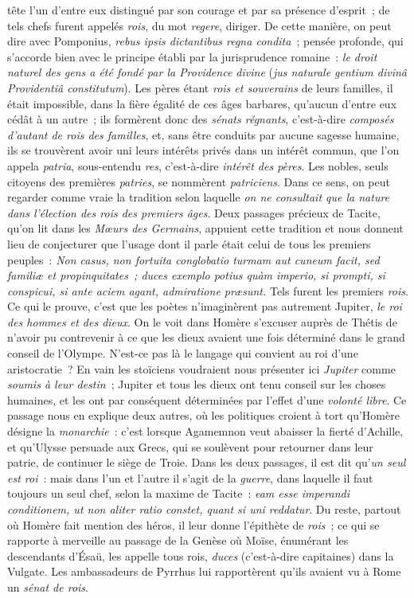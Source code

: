 \documentclass[french,twoside]{book} %
\begin{document}
tête l’un d’entre eux distingué par son courage et par sa présence d’esprit ; de tels chefs furent appelés {\itshape rois}, du mot {\itshape regere}, diriger. De cette manière, on peut dire avec Pomponius, \emph{{\itshape rebus ipsis dictantibus regna condita}} ;  pensée profonde, qui s’accorde bien avec le principe établi par la jurisprudence romaine : {\itshape le droit naturel des gens a été fondé par la Providence divine} (\emph{{\itshape jus naturale gentium divinâ Providentiâ constitutum}}). Les pères étant {\itshape rois et souverains} de leurs familles, il était impossible, dans la fière égalité de ces âges barbares, qu’aucun d’entre eux cédât à un autre ; ils formèrent donc des {\itshape sénats régnants}, c’est-à-dire {\itshape composés d’autant de rois des familles}, et, sans être conduits par aucune sagesse humaine, ils se trouvèrent avoir uni leurs intérêts privés dans un intérêt commun, que l’on appela {\itshape patria}, sous-entendu {\itshape res}, c’est-à-dire {\itshape intérêt des pères}. Les nobles, seuls citoyens des premières {\itshape patries}, se nommèrent {\itshape patriciens}. Dans ce sens, on peut regarder comme vraie la tradition selon laquelle {\itshape on ne consultait que la nature dans l’élection des rois des premiers âges}. Deux passages précieux de Tacite, qu’on lit dans les {\itshape Mœurs des Germains}, appuient cette tradition et nous donnent lieu de conjecturer que l’usage dont il parle était celui de tous les premiers peuples : \emph{{\itshape Non casus, non fortuita conglobatio turmam aut cuneum facit, sed familiæ et propinquitates ; duces exemplo potius quàm imperio, si prompti, si conspicui, si ante aciem agant, admiratione præsunt.}} Tels furent les premiers {\itshape rois}. Ce qui le prouve, c’est que les poètes n’imaginèrent pas autrement Jupiter, {\itshape le roi des hommes et des dieux}. On le voit dans Homère s’excuser auprès de Thétis de n’avoir pu contrevenir à ce que les dieux avaient une fois  déterminé dans le grand conseil de l’Olympe. N’est-ce pas là le langage qui convient au roi d’une aristocratie ? En vain les stoïciens voudraient nous présenter ici {\itshape Jupiter} comme {\itshape soumis à leur destin} ; Jupiter et tous les dieux ont tenu conseil sur les choses humaines, et les ont par conséquent déterminées par l’effet d’une {\itshape volonté libre}. Ce passage nous en explique deux autres, où les politiques croient à tort qu’Homère désigne la {\itshape monarchie} : c’est lorsque Agamemnon veut abaisser la fierté d’Achille, et qu’Ulysse persuade aux Grecs, qui se soulèvent pour retourner dans leur patrie, de continuer le siège de Troie. Dans les deux passages, il est dit qu’{\itshape un seul est roi} : mais dans l’un et l’autre il s’agit de la {\itshape guerre}, dans laquelle il faut toujours un seul chef, selon la maxime de Tacite : \emph{{\itshape eam esse imperandi conditionem, ut non aliter ratio constet, quant si uni reddatur}}. Du reste, partout où Homère fait mention des héros, il leur donne l’épithète de {\itshape rois} ; ce qui se rapporte à merveille au passage de la Genèse où Moïse, énumérant les descendants d’Ésaü, les appelle tous rois, {\itshape duces} (c’est-à-dire capitaines) dans la Vulgate. Les ambassadeurs de Pyrrhus lui rapportèrent qu’ils avaient vu à Rome un {\itshape sénat de rois}.\par
\end{document}
